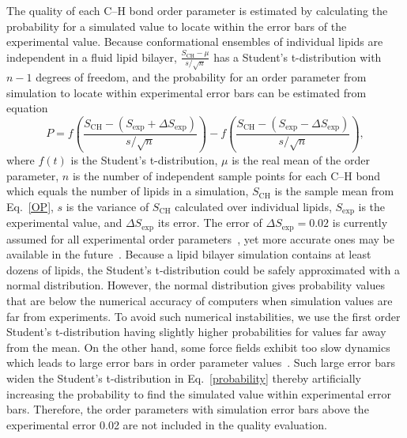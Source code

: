 \documentclass[fleqn,10pt]{wlscirep}
\begin{document}
The quality of each C--H bond order parameter is estimated by calculating the probability for a simulated value to locate within the error bars of the experimental value. Because conformational ensembles of individual lipids are independent in a fluid lipid bilayer, $\frac{S_\mathrm{CH}-\mu}{s/\sqrt{n}}$ has a Student's t-distribution with $n-1$ degrees of freedom, and the probability for an order parameter from simulation to locate within experimental error bars can be estimated from equation
\begin{equation}\label{probability}
  P = f \left( \frac{S_\mathrm{CH} - (S_\mathrm{exp}+\Delta S_\mathrm{exp})}{s/\sqrt{n}} \right) - f \left( \frac{S_\mathrm{CH} - (S_\mathrm{exp}-\Delta S_\mathrm{exp})}{s/\sqrt{n}} \right),
\end{equation}
where $f(t)$ is the %
Student's t-distribution, $\mu$ is the real mean of the order parameter, $n$ is the number of independent sample points for each C--H bond which equals the number of lipids in a simulation, $S_\mathrm{CH}$ is the sample mean from Eq.~\ref{OP}, $s$ is the variance of $S_\mathrm {CH}$ calculated over individual lipids, $S_\mathrm{exp}$ is the experimental value, and $\Delta S_\mathrm{exp}$ its error. The error of $\Delta S_\mathrm{exp} = 0.02$ is currently assumed for all experimental order parameters~\cite{ollila16}, yet more accurate ones may be available in the future~\cite{wurl22}. Because a lipid bilayer simulation contains at least dozens of lipids, the Student's t-distribution could be safely approximated with a normal distribution. However, the normal distribution gives probability values that are below the numerical accuracy of computers when simulation values are far from experiments. To avoid such numerical instabilities, we use the first order Student's t-distribution having slightly higher probabilities for values far away from the mean.
On the other hand, some force fields exhibit too slow dynamics which leads to large error bars in order parameter values~\cite{antila21a}. Such large error bars widen the Student's t-distribution in Eq.~\ref{probability} thereby artificially increasing the probability to find the simulated value within experimental error bars. Therefore, the order parameters with simulation error bars above the experimental error 0.02 are not included in the quality evaluation.
\end{document}
